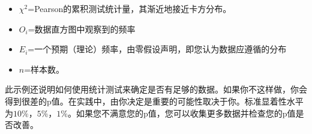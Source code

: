 \begin{itemize}

\item $\chi^2$=Pearson的累积测试统计量，其渐近地接近卡方分布。
\item $O_i$=数据直方图中观察到的频率
\item $E_i$=一个预期（理论）频率，由零假设声明，即您认为数据应遵循的分布
\item $n$=样本数。
\end{itemize}


此示例还说明如何使用统计测试来确定是否有足够的数据。如果你不这样做，你会得到很差的p值。在实践中，由你决定是重要的可能性取决于你。标准显着性水平为$10\%$，$5\%$，$1\%$。如果您不满意您的p值，您可以收集更多数据并检查您的p值是否改善。



